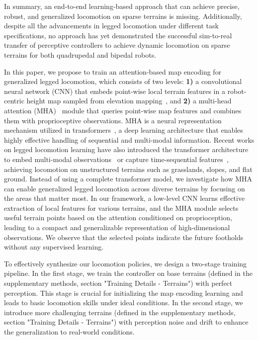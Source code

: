 \documentclass[9pt,twocolumn,twoside]{osajnl}
\begin{document}
In summary, an end-to-end learning-based approach that can achieve precise, robust, and generalized locomotion on sparse terrains is missing. Additionally, despite all the advancements in legged locomotion under different task specifications, no approach has yet demonstrated the successful sim-to-real transfer of perceptive controllers to achieve dynamic locomotion on sparse terrains for both quadrupedal and bipedal robots. 

In this paper, we propose to train an attention-based map encoding for generalized legged locomotion, which consists of two levels: \textbf{1)} a convolutional neural network (CNN) that embeds point-wise local terrain features in a robot-centric height map sampled from elevation mapping~\cite{elevationmapping_cupy}, and \textbf{2)} a multi-head attention (MHA)~\cite{NIPS2017_3f5ee243} module that queries point-wise map features and combines them with proprioceptive observations. MHA is a neural representation mechanism utilized in transformers~\cite{NIPS2017_3f5ee243}, a deep learning architecture that enables highly effective handling of sequential and multi-modal information. Recent works on legged locomotion learning have also introduced the transformer architecture to embed multi-modal observations~\cite{yang2022learning} or capture time-sequential features~\cite{jitendra_SR}, achieving locomotion on unstructured terrains such as grasslands, slopes, and flat ground. Instead of using a complete transformer model, we investigate how MHA can enable generalized legged locomotion across diverse terrains by focusing on the areas that matter most. In our framework, a low-level CNN learns effective extraction of local features for various terrains, and the MHA module selects useful terrain points based on the attention conditioned on proprioception, leading to a compact and generalizable representation of high-dimensional observations. We observe that the selected points indicate the future footholds without any supervised learning. 

To effectively synthesize our locomotion policies, we design a two-stage training pipeline. In the first stage, we train the controller on base terrains (defined in the supplementary methods, section "Training Details - Terrains") with perfect perception. This stage is crucial for initializing the map encoding learning and leads to basic locomotion skills under ideal conditions. In the second stage, we introduce more challenging terrains (defined in the supplementary methods, section "Training Details - Terrains") with perception noise and drift to enhance the generalization to real-world conditions.
\end{document}

